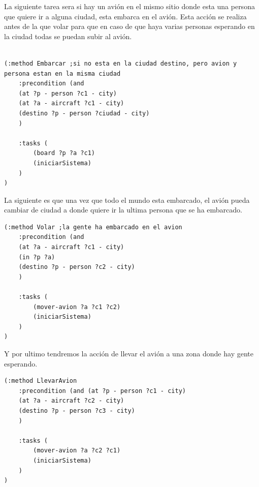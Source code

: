 \documentclass[12pt,a4paper]{article}
\begin{document}
La siguiente tarea sera si hay un avión en el mismo sitio donde esta una persona que quiere ir a alguna ciudad, esta embarca en el avión. Esta acción se realiza antes de la que volar para que en caso de que haya varias personas esperando en la ciudad todas se puedan subir al avión. 
\begin{lstlisting}

(:method Embarcar ;si no esta en la ciudad destino, pero avion y persona estan en la misma ciudad
	:precondition (and 
	(at ?p - person ?c1 - city)
	(at ?a - aircraft ?c1 - city)
	(destino ?p - person ?ciudad - city)
	)
	
	:tasks ( 
		(board ?p ?a ?c1)
		(iniciarSistema)
	)
)
\end{lstlisting}

La siguiente es que una vez que todo el mundo esta embarcado, el avión pueda cambiar de ciudad a donde quiere ir la ultima persona que se ha embarcado.
\begin{lstlisting}
(:method Volar ;la gente ha embarcado en el avion
	:precondition (and 
	(at ?a - aircraft ?c1 - city)
	(in ?p ?a)
	(destino ?p - person ?c2 - city)
	)
	
	:tasks ( 
		(mover-avion ?a ?c1 ?c2)
		(iniciarSistema)
	)
)
\end{lstlisting}

Y por ultimo tendremos la acción de llevar el avión a una zona donde hay gente esperando. 
\begin{lstlisting}
(:method LlevarAvion
	:precondition (and (at ?p - person ?c1 - city)
	(at ?a - aircraft ?c2 - city)
	(destino ?p - person ?c3 - city)
	)
	
	:tasks ( 
		(mover-avion ?a ?c2 ?c1)
		(iniciarSistema)
	)
)
\end{lstlisting}
\end{document}
